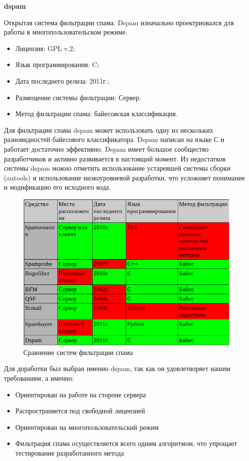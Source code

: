 \textbf{dspam} 

Открытая система фильтрации спама. Dspam изначально проектриовался для работы в многопользовательском режиме.
\begin{itemize}
\item Лицензия: GPL v.2;
\item Язык программирования: C;
\item Дата последнего релиза: 2011г.;
\item Размещение системы фильтрации: Сервер.
\item Метод фильтрации спама: байесовская классификация.
\end{itemize}

Для фильтрации спама dspam может использовать одну из нескольких разновидностей байесового классификатора.
Dspam написан на языке С и работает достаточно эффективно. Dspam имеет большое сообщество разработчиков и активно развивается в настоящий момент.
Из недостатков системы dspam можно отметить использование устаревшей системы сборки (autools) и использование низкоуровневой разработки, что усложняет понимание и модификацию его исходного кода.
\begin{figure}[h]
\begin{center}
\includegraphics[width=13cm]{img/compare}
\end{center}
\caption{Сравнение систем фильтрации спама}
\label{spam_systems}
\end{figure}


Для доработки был выбран именно dspam, так как он удовлетворяет нашим требованиям, а именно:
\begin{itemize}
\item Ориентирован на работе на стороне сервера
\item Распространяется под свободной лицензией
\item Ориентирован на многопользовательский режим
\item Фильтрация спама осуществляется  всего одним алгоритмом, что упрощает тестирование разработанного метода
\end{itemize}

